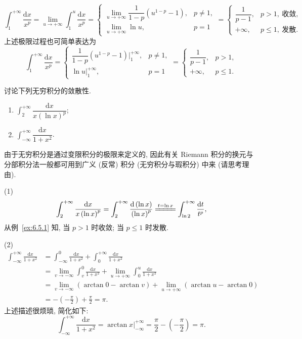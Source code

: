 \begin{solution}
\[
\int_{1}^{+\infty}\frac{\mathrm{d}x}{x^{p}}=\lim_{u\to+\infty}\int_{1}^{u}\frac{\mathrm{d}x}{x^{p}}=\begin{cases}
\lim\limits_{u\to+\infty}\dfrac{1}{1-p}\left(u^{1-p}-1\right), & p\neq1,\\[3mm]
\lim\limits_{u\to+\infty}\ln u, & p=1
\end{cases}=\begin{cases}
\dfrac{1}{p-1}, & p>1,\ \text{收敛},\\[3mm]
+\infty, & p\leqslant1,\ \text{发散}.
\end{cases}
\]
上述极限过程也可简单表达为
\[
\int_{1}^{+\infty}\frac{\mathrm{d}x}{x^{p}}=\begin{cases}
\dfrac{1}{1-p}\left(u^{1-p}-1\right)\bigg|_{1}^{+\infty}, & p\neq1,\\[3mm]
\ln u\bigg|_{1}^{+\infty}, & p=1
\end{cases}=\begin{cases}
\dfrac{1}{p-1}, & p>1,\\[3mm]
+\infty, & p\leqslant1.
\end{cases}
\]
\end{solution}

\begin{example}\label{ex:6.5.2}
讨论下列无穷积分的敛散性.
\begin{enumerate}[label=(\arabic*)]
\item $\int_{2}^{+\infty}\dfrac{\mathrm{d}x}{x\left(\ln x\right)^{p}}$;
\item $\int_{-\infty}^{+\infty}\dfrac{\mathrm{d}x}{1+x^{2}}$.
\end{enumerate}
\end{example}

\begin{solution}
由于无穷积分是通过变限积分的极限来定义的, 因此有关 Riemann 积分的换元与分部积分法一般都可用到广义 (反常) 积分 (无穷积分与瑕积分) 中来 (请思考理由).

(1)
\[
\int_{2}^{+\infty}\frac{\mathrm{d}x}{x\left(\ln x\right)^{p}}=\int_{2}^{+\infty}\frac{\mathrm{d}\left(\ln x\right)}{\left(\ln x\right)^{p}}\xlongequal{t=\ln x}\int_{\ln2}^{+\infty}\frac{\mathrm{d}t}{t^{p}},
\]
从例~\ref{ex:6.5.1} 知, 当 $p>1$ 时收敛; 当 $p\leqslant1$ 时发散.

(2)
\begin{align*}
\int_{-\infty}^{+\infty}\frac{\mathrm{d}x}{1+x^{2}}&=\int_{-\infty}^{0}\frac{\mathrm{d}x}{1+x^{2}}+\int_{0}^{+\infty}\frac{\mathrm{d}x}{1+x^{2}}\\
&=\lim_{v\to-\infty}\int_{v}^{0}\frac{\mathrm{d}x}{1+x^{2}}+\lim_{u\to+\infty}\int_{0}^{u}\frac{\mathrm{d}x}{1+x^{2}}\\
&=\lim_{v\to-\infty}(\arctan0-\arctan v)+\lim_{u\to+\infty}(\arctan u-\arctan0)\\
&=-\left(-\frac{\pi}{2}\right)+\frac{\pi}{2}=\pi.
\end{align*}
上述描述很烦琐, 简化如下:
\[
\int_{-\infty}^{+\infty}\frac{\mathrm{d}x}{1+x^{2}}=\arctan x\bigg|_{-\infty}^{+\infty}=\frac{\pi}{2}-\left(-\frac{\pi}{2}\right)=\pi.
\]
\end{solution}

